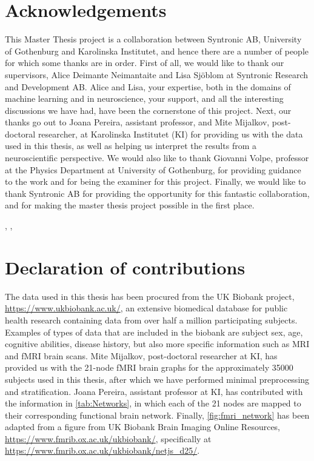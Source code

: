 \thispagestyle{plain}			%
\section*{Acknowledgements}
This Master Thesis project is a collaboration between Syntronic AB, University of Gothenburg and Karolinska Institutet, and hence there are a number of people for which some thanks are in order. First of all, we would like to thank our supervisors, Alice Deimante Neimantaite and Lisa Sjöblom at Syntronic Research and Development AB. Alice and Lisa, your expertise, both in the domains of machine learning and in neuroscience, your support, and all the interesting discussions we have had, have been the cornerstone of this project. Next, our thanks go out to Joana Pereira, assistant professor, and Mite Mijalkov, post-doctoral researcher, at Karolinska Institutet (KI) for providing us with the data used in this thesis, as well as helping us interpret the results from a neuroscientific perspective. We would also like to thank Giovanni Volpe, professor at the Physics Department at University of Gothenburg, for providing guidance to the work and for being the examiner for this project. Finally, we would like to thank Syntronic AB for providing the opportunity for this fantastic collaboration, and for making the master thesis project possible in the first place.


\hfill
\thesisAuthor, \thesisCity, \thesisMonth\ \thesisYear
\vspace{0.5cm}
\section*{Declaration of contributions}
The data used in this thesis has been procured from the UK Biobank project, \url{https://www.ukbiobank.ac.uk/}, an extensive biomedical database for public health research containing data from over half a million participating subjects. Examples of types of data that are included in the biobank are subject sex, age, cognitive abilities, disease history, but also more specific information such as MRI and fMRI brain scans. Mite Mijalkov, post-doctoral researcher at KI, has provided us with the 21-node fMRI brain graphs for the approximately 35000 subjects used in this thesis, after which we have performed minimal preprocessing and stratification. Joana Pereira, assistant professor at KI, has contributed with the information in \cref{tab:Networks}, in which each of the 21 nodes are mapped to their corresponding functional brain network. Finally, \cref{fig:fmri_network} has been adapted from a figure from UK Biobank Brain Imaging Online Resources, \url{https://www.fmrib.ox.ac.uk/ukbiobank/}, specifically at \url{https://www.fmrib.ox.ac.uk/ukbiobank/netjs_d25/}. 

\if{}
\newpage				%
\thispagestyle{empty}
\mbox{}
\fi
